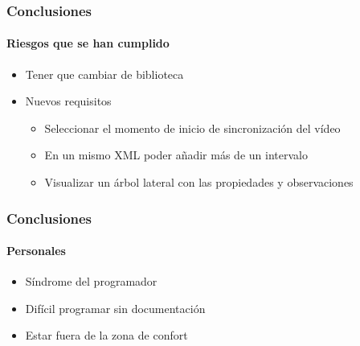 \begin{frame}
	\frametitle{Conclusiones}
	\framesubtitle{Riesgos que se han cumplido}
	\begin{itemize}
		\item Tener que cambiar de biblioteca
		\item Nuevos requisitos
		\begin{itemize}
			\item Seleccionar el momento de inicio de sincronizaci\'on del 
			v\'ideo
			\item En un mismo XML poder a\~nadir m\'as de un intervalo
			\item Visualizar un \'arbol lateral con las propiedades y 
			observaciones
		\end{itemize}
	\end{itemize}
\end{frame}

\begin{frame}
	\frametitle{Conclusiones}
	\framesubtitle{Personales}
	
	\begin{itemize}
		\item S\'indrome del programador
		\item Dif\'icil programar sin documentaci\'on
		\item Estar fuera de la zona de confort
	\end{itemize}
\end{frame}

